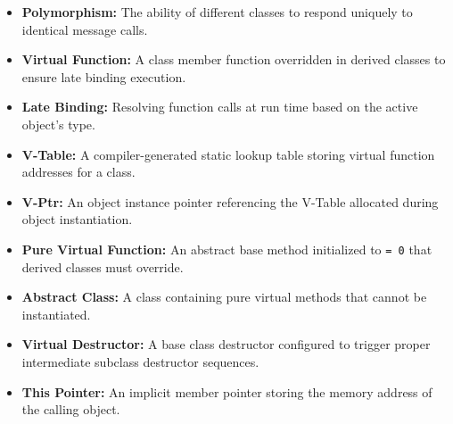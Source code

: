 \documentclass[12pt,a4paper]{article}
\begin{document}
\begin{tcolorbox}[defbox, title={\textbf{One-Line Definitions}}]
\begin{itemize}[leftmargin=*, itemsep=2.5pt, topsep=0pt]
  \item \textbf{Polymorphism:} The ability of different classes to respond uniquely to identical message calls.
  \item \textbf{Virtual Function:} A class member function overridden in derived classes to ensure late binding execution.
  \item \textbf{Late Binding:} Resolving function calls at run time based on the active object's type.
  \item \textbf{V-Table:} A compiler-generated static lookup table storing virtual function addresses for a class.
  \item \textbf{V-Ptr:} An object instance pointer referencing the V-Table allocated during object instantiation.
  \item \textbf{Pure Virtual Function:} An abstract base method initialized to \texttt{= 0} that derived classes must override.
  \item \textbf{Abstract Class:} A class containing pure virtual methods that cannot be instantiated.
  \item \textbf{Virtual Destructor:} A base class destructor configured to trigger proper intermediate subclass destructor sequences.
  \item \textbf{This Pointer:} An implicit member pointer storing the memory address of the calling object.
\end{itemize}
\end{tcolorbox}
\end{document}
